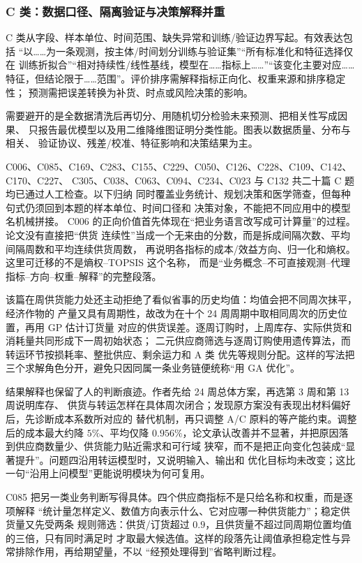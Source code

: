 \subsubsection{C 类：数据口径、隔离验证与决策解释并重}

C 类从字段、样本单位、时间范围、缺失异常和训练/验证边界写起。有效表达包括
“以……为一条观测，按主体/时间划分训练与验证集”“所有标准化和特征选择仅在
训练折拟合”“相对持续性/线性基线，模型在……指标上……”“该变化主要对应……
特征，但结论限于……范围”。评价排序需解释指标正向化、权重来源和排序稳定性；
预测需把误差转换为补货、时点或风险决策的影响。

需要避开的是全数据清洗后再切分、用随机切分检验未来预测、把相关性写成因果、
只报告最优模型以及用二维降维图证明分类性能。图表以数据质量、分布与相关、
验证协议、残差/校准、特征影响和决策结果为主。

C006、C085、C169、C283、C155、C229、C050、C126、C228、C109、C142、C170、C227、
C305、C038、C063、C094、C234、C023 与 C132 共二十篇 C 题均已通过人工检查。以下归纳
同时覆盖业务统计、规划决策和医学筛查，但每种句式仍须回到本题的样本单位、时间口径和
决策对象，不能把不同应用中的模型名机械拼接。
C006 的正向价值首先体现在“把业务语言改写成可计算量”的过程。论文没有直接把“供货
连续性”当成一个无来由的分数，而是拆成间隔次数、平均间隔周数和平均连续供货周数，
再说明各指标的成本/效益方向、归一化和熵权。这里可迁移的不是熵权--TOPSIS 这个名称，
而是“业务概念--不可直接观测--代理指标--方向--权重--解释”的完整段落。

该篇在周供货能力处还主动拒绝了看似省事的历史均值：均值会把不同周次抹平，经济作物的
产量又具有周期性，故改为在十个 24 周周期中取相同周次的历史位置，再用 GP 估计订货量
对应的供货误差。逐周订购时，上周库存、实际供货和消耗量共同形成下一周初始状态；
二元供应商筛选与逐周订购使用遗传算法，而转运环节按损耗率、整批供应、剩余运力和 A 类
优先等规则分配。这样的写法把三个求解角色分开，避免只因同属一条业务链便统称“用 GA
优化”。

结果解释也保留了人的判断痕迹。作者先给 24 周总体方案，再选第 3 周和第 13 周说明库存、
供货与转运怎样在具体周次闭合；发现原方案没有表现出材料偏好后，先诊断成本系数所对应的
替代机制，再只调整 A/C 原料的等产能约束。调整后的成本最大约降 $5\%$、平均仅降
$0.956\%$，论文承认改善并不显著，并把原因落到供应商数量少、供货能力贴近需求和可行域
狭窄，而不是把正向变化包装成“显著提升”。问题四沿用转运模型时，又说明输入、输出和
优化目标均未改变；这比一句“沿用上问模型”更能说明模块为何可复用。

C085 把另一类业务判断写得具体。四个供应商指标不是只给名称和权重，而是逐项解释
“统计量怎样定义、数值方向表示什么、它对应哪一种供货能力”；稳定供货量又先受两条
规则筛选：供货/订货超过 $0.9$，且供货量不超过同周期位置均值的三倍，只有同时满足时
才取最大候选值。这样的段落先让阈值承担稳定性与异常排除作用，再给期望量，不以
“经预处理得到”省略判断过程。

